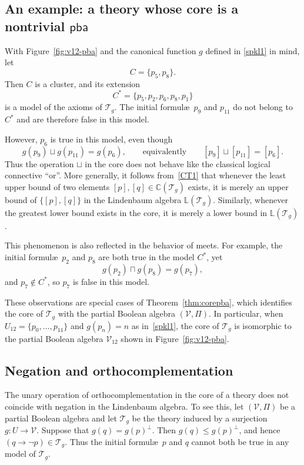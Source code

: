 \documentclass{article}   	%
\theoremstyle{plain}
\theoremstyle{definition}
\theoremstyle{remark}
\newcommand{\pba}{\mathsf{pba}}
\begin{document}
\subsection{An example: a theory whose core is a nontrivial $\pba$}
\label{orand}

With Figure~\ref{fig:v12-pba} and the canonical function $g$ defined in
\eqref{spkl1} in mind, let
\[
C=\{p_5,p_8\}.
\]
Then $C$ is a cluster, and its extension
\[
C^*=\{p_5,p_2,p_6,p_8,p_1\}
\]
is a model of the axioms of $\mathcal T_g$.
The initial formul\ae\ $p_9$ and $p_{11}$ do not belong to $C^*$ and are
therefore false in this model.

However, $p_6$ is true in this model, even though
\[
g(p_9)\sqcup g(p_{11})=g(p_6),
\qquad\text{equivalently}\qquad
[p_9]\sqcup[p_{11}]=[p_6].
\]
Thus the operation $\sqcup$ in the core does not behave like the classical
logical connective ``or''.
More generally, it follows from~\eqref{CT1} that whenever the least upper
bound of two elements $[p],[q]\in\mathbb C(\mathcal T_g)$ exists, it is
merely an upper bound of $\{[p],[q]\}$ in the Lindenbaum algebra
$\mathbb L(\mathcal T_g)$.
Similarly, whenever the greatest lower bound exists in the core, it is
merely a lower bound in $\mathbb L(\mathcal T_g)$.

This phenomenon is also reflected in the behavior of meets.
For example, the initial formul\ae\ $p_2$ and $p_8$ are both true in the
model $C^*$, yet
\[
g(p_2)\sqcap g(p_8)=g(p_7),
\]
and $p_7\notin C^*$, so $p_7$ is false in this model.

These observations are special cases of Theorem~\ref{thm:corepba}, which identifies
the core of $\mathcal T_g$ with the partial Boolean algebra $(\mathcal V,\Pi)$.
In particular, when $U_{12}=\{p_0,\dots,p_{11}\}$ and
$g(p_n)=n$ as in~\eqref{spkl1}, the core of $\mathcal T_g$ is
isomorphic to the partial Boolean algebra $\mathcal V_{12}$ shown in
Figure~\ref{fig:v12-pba}.

\subsection{Negation and orthocomplementation}
\label{xnot}

The unary operation of orthocomplementation in the core of a theory does not
coincide with negation in the Lindenbaum algebra.
To see this, let $(\mathcal V,\Pi)$ be a partial Boolean algebra and let
$\mathcal T_g$ be the theory induced by a surjection
$g:U\to\mathcal V$.
Suppose that $g(q)=g(p)^\perp$.
Then $g(q)\le g(p)^\perp$, and hence $(q\to\neg p)\in\mathcal T_g$.
Thus the initial formul\ae\ $p$ and $q$ cannot both be true in any model of
$\mathcal T_g$.
\end{document}
